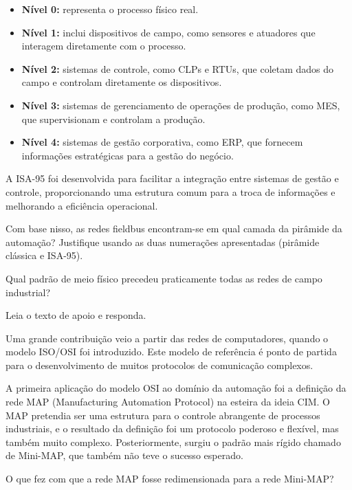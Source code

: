 \documentclass[11pt,a4paper]{article}
\newcommand{\q}[1]{\par\vspace{0.9em}\noindent{\color{Accent}\bfseries #1}\hspace{0.7em}}
\begin{document}
\begin{apoio}
\begin{itemize}[leftmargin=1.2em, itemsep=2pt, topsep=3pt]
\item \textbf{Nível 0:} representa o processo físico real.
\item \textbf{Nível 1:} inclui dispositivos de campo, como sensores e atuadores que interagem diretamente com o processo.
\item \textbf{Nível 2:} sistemas de controle, como CLPs e RTUs, que coletam dados do campo e controlam diretamente os dispositivos.
\item \textbf{Nível 3:} sistemas de gerenciamento de operações de produção, como MES, que supervisionam e controlam a produção.
\item \textbf{Nível 4:} sistemas de gestão corporativa, como ERP, que fornecem informações estratégicas para a gestão do negócio.
\end{itemize}

A ISA-95 foi desenvolvida para facilitar a integração entre sistemas de gestão e controle, proporcionando uma estrutura comum para a troca de informações e melhorando a eficiência operacional.
\end{apoio}

Com base nisso, as redes fieldbus encontram-se em qual camada da pirâmide da automação? Justifique usando as duas numerações apresentadas (pirâmide clássica e ISA-95).

\q{1.3} Qual padrão de meio físico precedeu praticamente todas as redes de campo industrial?

\q{1.4} Leia o texto de apoio e responda.

\begin{apoio}
Uma grande contribuição veio a partir das redes de computadores, quando o modelo ISO/OSI foi introduzido. Este modelo de referência é ponto de partida para o desenvolvimento de muitos protocolos de comunicação complexos.

A primeira aplicação do modelo OSI ao domínio da automação foi a definição da rede MAP (Manufacturing Automation Protocol) na esteira da ideia CIM. O MAP pretendia ser uma estrutura para o controle abrangente de processos industriais, e o resultado da definição foi um protocolo poderoso e flexível, mas também muito complexo. Posteriormente, surgiu o padrão mais rígido chamado de Mini-MAP, que também não teve o sucesso esperado.
\end{apoio}

O que fez com que a rede MAP fosse redimensionada para a rede Mini-MAP?
\end{document}
